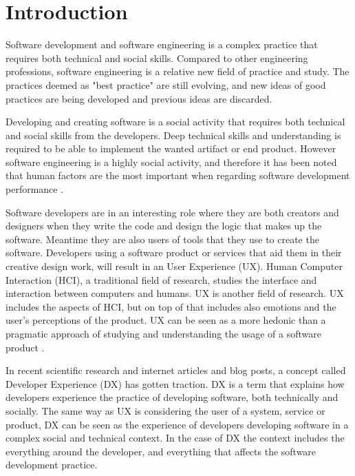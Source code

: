 \documentclass[english, 12pt, a4paper, sci, utf8, a-1b, online]{aaltothesis}
\begin{document}
\cleardoublepage
\section{Introduction} \label{introduction}

Software development and software engineering is a complex practice that requires both technical and social skills. Compared to other engineering professions, software engineering is a relative new field of practice and study. The practices deemed as "best practice" are still evolving, and new ideas of good practices are being developed and previous ideas are discarded.

Developing and creating software is a social activity that requires both technical and social skills from the developers. Deep technical skills and understanding is required to be able to implement the wanted artifact or end product. However software engineering is a highly social activity, and therefore it has been noted that human factors are the most important when regarding software development performance \parencite{peopleware}.

Software developers are in an interesting role where they are both creators and designers when they write the code and design the logic that makes up the software. Meantime they are also users of tools that they use to create the software. Developers using a software product or services that aid them in their creative design work, will result in an User Experience (UX). Human Computer Interaction (HCI), a traditional field of research, studies the interface and interaction between computers and humans. UX is another field of research. UX includes the aspects of HCI, but on top of that includes also emotions and the user's perceptions of the product. UX can be seen as a more hedonic than a pragmatic approach of studying and understanding the usage of a software product \parencite{the-thing-and-i}.

In recent scientific research and internet articles and blog posts, a concept called Developer Experience (DX) has gotten traction. DX is a term that explains how developers experience the practice of developing software, both technically and socially. The same way as UX is considering the user of a system, service or product, DX can be seen as the experience of developers developing software in a complex social and technical context. In the case of DX the context includes the everything around the developer, and everything that affects the software development practice.
\end{document}
